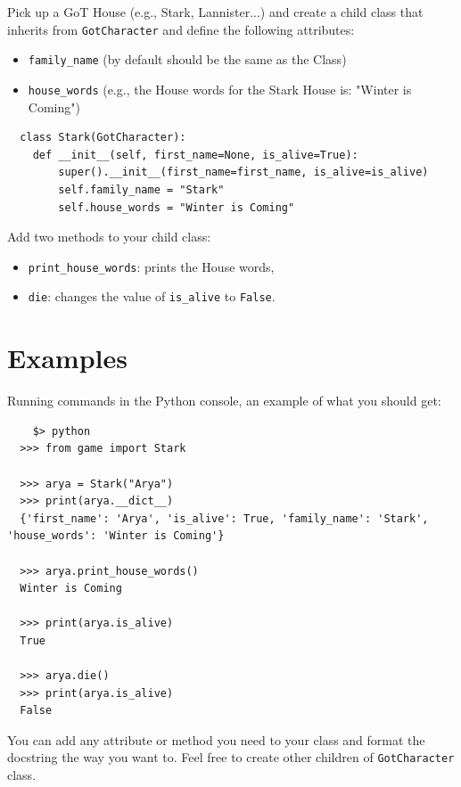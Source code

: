 \documentclass{42-en}
\begin{document}
Pick up a GoT House (e.g., Stark, Lannister...) and create a child class that inherits from \texttt{GotCharacter} and 
define the following attributes:
\begin{itemize}
  \item \texttt{family\_name} (by default should be the same as the Class)
  \item \texttt{house\_words} (e.g., the House words for the Stark House is: "Winter is Coming")
\end{itemize}

\begin{verbatim}
  class Stark(GotCharacter):
    def __init__(self, first_name=None, is_alive=True):
        super().__init__(first_name=first_name, is_alive=is_alive)
        self.family_name = "Stark"
        self.house_words = "Winter is Coming"
\end{verbatim}

Add two methods to your child class:
\begin{itemize}
  \item \texttt{print\_house\_words}: prints the House words,
  \item \texttt{die}: changes the value of \texttt{is\_alive} to \texttt{False}.
\end{itemize}

\section*{Examples}

Running commands in the Python console, an example of what you should get:
\begin{verbatim}
	$> python
  >>> from game import Stark
  
  >>> arya = Stark("Arya")
  >>> print(arya.__dict__)
  {'first_name': 'Arya', 'is_alive': True, 'family_name': 'Stark', 'house_words': 'Winter is Coming'}
  
  >>> arya.print_house_words()
  Winter is Coming
  
  >>> print(arya.is_alive)
  True
  
  >>> arya.die()
  >>> print(arya.is_alive)
  False
\end{verbatim}

You can add any attribute or method you need to your class and format the docstring the way you want to.
Feel free to create other children of \texttt{GotCharacter} class.
\end{document}
